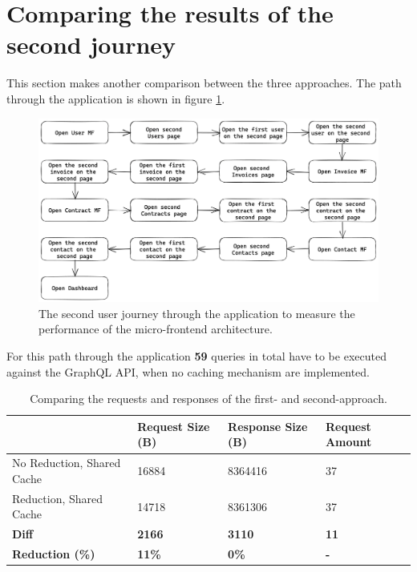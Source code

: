 \section{Comparing the results of the second journey}

This section makes another comparison between the three approaches. The path through the application is shown in figure \ref{fig:results:evaluation-second-path}.


\ifshowImages
\begin{figure}[H]
\centering
\includegraphics[width=1\linewidth]{images/results/evaluation-second-path.png}
\caption{The second user journey through the application to measure the performance of the micro-frontend architecture.}\label{fig:results:evaluation-second-path}
\end{figure}
\fi

\noindent For this path through the application \textbf{59} queries in total have to be executed against the
GraphQL \ac{API}, when no caching mechanism are implemented.

\begin{table}[H]
    \begin{tabular}{|l|l|l|l|}
    \hline
                                    & Request Size (B) & Response Size (B) & Request Amount  \\
    \hline
     No Reduction, Shared Cache     &  16884       &  8364416   & 37 \\
     \hline
     Reduction, Shared Cache        &  14718       &  8361306   & 37 \\
     \hline
     \hline
    \textbf{Diff}                   & \textbf{2166} & \textbf{3110} & \textbf{11} \\
    \hline
    \textbf{Reduction (\%)} & \textbf{11\%} & \textbf{0\%} & \textbf{-} \\
     \hline
    \end{tabular}
    \caption{Comparing the requests and responses of the first- and second-approach.}
    \label{tab:serious-game-comparison}
\end{table}

